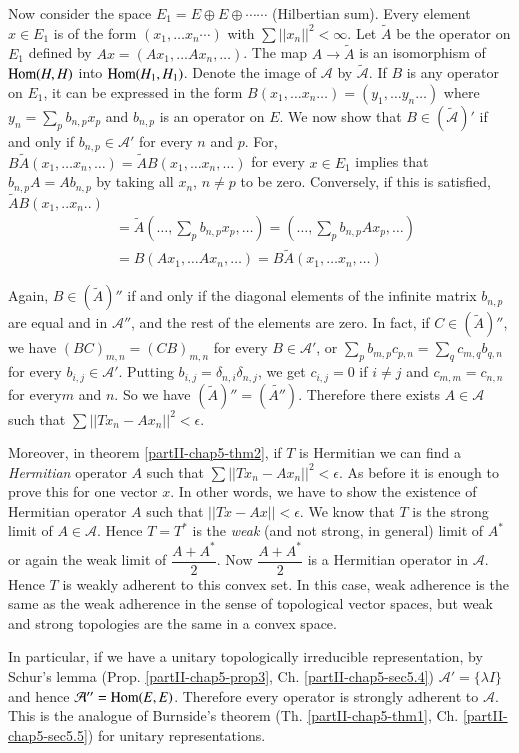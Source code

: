 Now consider the space $E_1 = E \oplus E  \oplus \cdots
\cdots$ (Hilbertian sum). Every element $x \in E_1$ is of the form
$(x_1,\ldots x_n \cdots)$ with $\sum|| x_n||^{2} < \infty$. Let
$\tilde{A}$ be the operator on $E_1$ defined by $Ax = (Ax_1,  \ldots
Ax_n,  \ldots)$. The map $A \rightarrow\tilde{A}$ is an isomorphism
of $\operatorname{Hom}(H,H)$ into $\operatorname{Hom}(H_1,H_1)$. Denote the image of
$\mathcal{A}$ by $\tilde{\mathcal{A}}$. If $B$ is any operator on
$E_1$, it can be expressed in the form $B(x_1, \ldots x_n \ldots )
= (y_1, \ldots y_n \ldots)$ where $y_n = \sum\limits_{p}
b_{n,p} x_p$ and $b_{n,p}$ is an operator on $E$. We now show that
$B \in (\tilde{\mathcal{A}})'$ if and only if $b_{n,p} \in
\mathcal{A}'$ for every $n$ and $p$. For, $B\tilde{A} (x_1,\ldots
x_n, \ldots) = \tilde{A}B (x_1, \ldots x_n, \ldots)$ for every
$x \in E_1$ implies that $b_{n,p}  A = Ab_{n,p}$ by taking all
$x_n$, $n \neq p$ to be zero. Conversely, if this is
satisfied, $\tilde{A}B (x_1,.. x_n ..)$ 
\begin{align*}
 & = \tilde{A}(\ldots, \sum\limits_{p} b_{n,p} x_p, \ldots) =
  (\ldots, \sum\limits_{p} b_{n,p}  Ax_p, \ldots)\\ 
 & = B( Ax_1, \ldots Ax_n, \ldots) = B \tilde{A}(x_{1}, \ldots
  x_n, \ldots) 
 \end{align*}

Again, $B \in (\tilde{A})''$ if and only if the diagonal elements of
the infinite matrix $b_{n,p}$ are equal and in $\mathcal{A}''$, and the
rest of the elements are zero. In fact, if $ C \in (\tilde{A})''$, we
have $(BC)_{m,n} = (CB)_{m,n}$ for every $B \in \mathcal{A}'$, or
$\sum\limits_{p} b_{m,p}  c_{p,n} = \sum\limits_{q}  c_{m,q}
b_{q,n}$  for every $b_{i,j} \in \mathcal{A}'$. Putting $b_{i,j} =
\delta_{n,i} \delta_{n,j}$, we get $c_{i,j} = 0$ if $i \neq j$ and
$c_{m,m} = c_{n,n}$ for every\pageoriginale $m$ and $n$. 
So we have $(\tilde{A})'' =
(\widetilde{A''})$. Therefore there exists $A \in \mathcal{A}$ such that
$\sum|| Tx_n - Ax_n||^{2} < \epsilon$.  
  
Moreover, in theorem \ref{partII-chap5-thm2}, if $T$ is Hermitian we
can find a \textit{Hermitian} operator $A$ such that $\sum|| Tx_n - Ax_n||^{2}<
\epsilon$. As before it is enough to prove this for one vector $x$. In
other words, we have to show the existence of Hermitian operator $A$
such that $|| Tx - Ax || < \epsilon$. We know that $T$ is the strong limit
of $A \in \mathcal{A}$. Hence $T= T^*$ is the \textit{weak} (and not
strong, in general) limit of $A^*$ or again the weak limit of
$\dfrac{A + A^*}{2}$. Now $\dfrac{A+A^*}{2}$ is a Hermitian operator
in $\mathcal{A}$. Hence $T$ is weakly adherent to this convex set. In
this case, weak adherence is the same as the weak adherence in the
sense of topological vector spaces, but weak and strong topologies are
the same in a convex space. 
 
 
In particular, if we have a unitary topologically irreducible
representation, by Schur's lemma (Prop. \ref{partII-chap5-prop3},
Ch. \ref{partII-chap5-sec5.4}) $\mathcal{A}' 
= \{\lambda I \}$ and hence $\mathcal{A}''  = \operatorname{Hom}(E,E)$. Therefore
every operator is strongly adherent to $\mathcal{A}$. This is the
analogue of Burnside's theorem (Th. \ref{partII-chap5-thm1},
Ch. \ref{partII-chap5-sec5.5}) for unitary 
representations.
